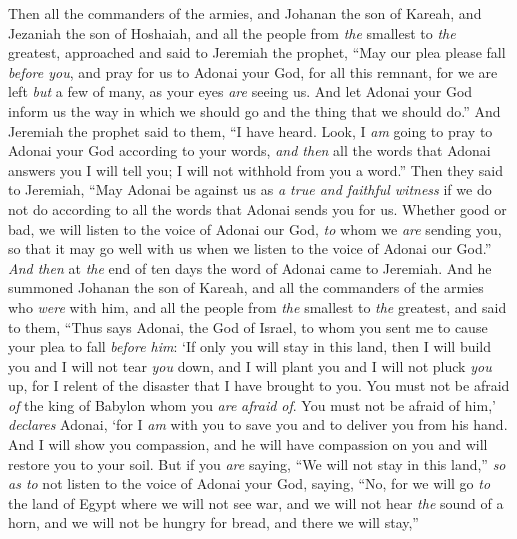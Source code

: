 \begin{biblechapter} %
 Then all the commanders of the armies, and Johanan the son of Kareah, and Jezaniah the son of Hoshaiah, and all the people from \textit{the} smallest to \textit{the} greatest, approached
\verse and said to Jeremiah the prophet, “May our plea please fall \textit{before you}, and pray for us to Adonai your God, for all this remnant, for we are left \textit{but} a few of many, as your eyes \textit{are} seeing us.
\verse And let Adonai your God inform us the way in which we should go and the thing that we should do.”
\verse And Jeremiah the prophet said to them, “I have heard. Look, I \textit{am} going to pray to Adonai your God according to your words, \textit{and then} all the words that Adonai answers you I will tell you; I will not withhold from you a word.”
\verse Then they said to Jeremiah, “May Adonai be against us as \textit{a true and faithful witness} if we do not do according to all the words that Adonai sends you for us.
\verse Whether good or bad, we will listen to the voice of Adonai our God, \textit{to} whom we \textit{are} sending you, so that it may go well with us when we listen to the voice of Adonai our God.”
 \textit{And then} at \textit{the} end of ten days the word of Adonai came to Jeremiah.
\verse And he summoned Johanan the son of Kareah, and all the commanders of the armies who \textit{were} with him, and all the people from \textit{the} smallest to \textit{the} greatest,
\verse and said to them, “Thus says Adonai, the God of Israel, to whom you sent me to cause your plea to fall \textit{before him}:
\verse ‘If only you will stay in this land, then I will build you and I will not tear \textit{you} down, and I will plant you and I will not pluck \textit{you} up, for I relent of the disaster that I have brought to you.
\verse You must not be afraid \textit{of} the king of Babylon whom you \textit{are} \textit{afraid of}. You must not be afraid of him,’ \textit{declares} Adonai, ‘for I \textit{am} with you to save you and to deliver you from his hand.
\verse And I will show you compassion, and he will have compassion on you and will restore you to your soil.
\verse But if you \textit{are} saying, “We will not stay in this land,” \textit{so as to} not listen to the voice of Adonai your God,
\verse saying, “No, for we will go \textit{to} the land of Egypt where we will not see war, and we will not hear \textit{the} sound of a horn, and we will not be hungry for bread, and there we will stay,”

\end{biblechapter}
